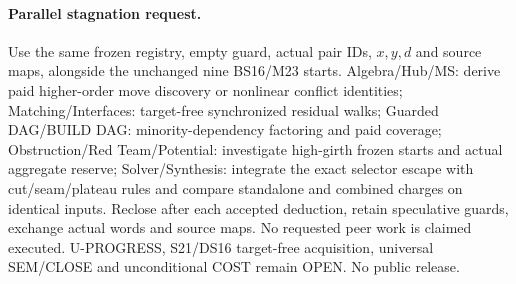 \documentclass[11pt]{article}
\begin{document}
\paragraph{Parallel stagnation request.}
Use the same frozen registry, empty guard, actual pair IDs, $x,y,d$ and source maps, alongside the unchanged nine BS16/M23 starts. Algebra/Hub/MS: derive paid higher-order move discovery or nonlinear conflict identities; Matching/Interfaces: target-free synchronized residual walks; Guarded DAG/BUILD DAG: minority-dependency factoring and paid coverage; Obstruction/Red Team/Potential: investigate high-girth frozen starts and actual aggregate reserve; Solver/Synthesis: integrate the exact selector escape with cut/seam/plateau rules and compare standalone and combined charges on identical inputs. Reclose after each accepted deduction, retain speculative guards, exchange actual words and source maps. No requested peer work is claimed executed. U-PROGRESS, S21/DS16 target-free acquisition, universal SEM/CLOSE and unconditional COST remain OPEN. No public release.
\end{document}

